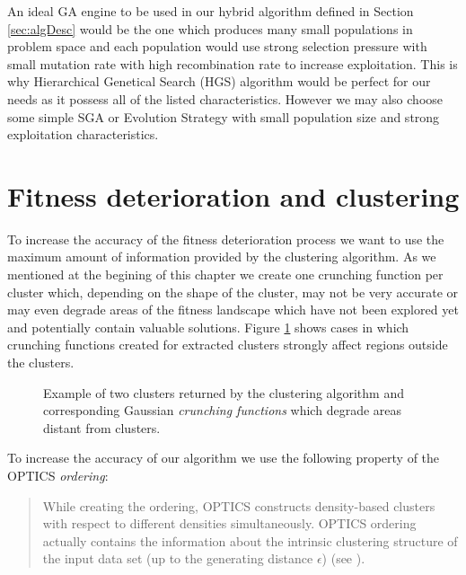 An ideal GA engine to be used in our hybrid algorithm defined in Section
\ref{sec:algDesc} would be the one which produces many small populations in problem space and
each population would use strong selection pressure with small mutation rate
with high recombination rate to increase exploitation. This is why Hierarchical 
Genetical Search (HGS) \cite{WierzbaSemczukKolodziejSchaefer2003} algorithm
would be perfect for our needs as it possess all of the listed characteristics. 
However we may also choose some simple 
SGA or Evolution Strategy with small population size and strong exploitation
characteristics.
 

\section{Fitness deterioration and clustering}
\label{sec:FitDetClust}

To increase the accuracy of the fitness deterioration process 
we want to use the maximum amount of information provided by the clustering
algorithm. As we mentioned at the begining of this chapter we create one
crunching function per cluster which, depending on the shape of the cluster, 
may not be very accurate or may even degrade areas
of the fitness landscape which have not been explored yet and potentially
contain valuable solutions. 
Figure \ref{fig:hardClusters1} shows cases in which
crunching functions created for extracted clusters strongly affect regions outside the clusters.

\begin{figure}
  \centering
  \caption{Example of two clusters returned by the clustering algorithm
  and corresponding Gaussian \textit{crunching functions} which degrade
  areas distant from clusters.}
  \label{fig:hardClusters1}
\end{figure}
 
 
To increase the accuracy of our algorithm
we use the following property of the OPTICS \textit{ordering}:
\begin{quotation}
\noindent
While creating the ordering, OPTICS constructs density-based clusters
with respect to different densities simultaneously. OPTICS ordering
actually contains the information about the intrinsic clustering structure of
the input data set (up to the generating distance $\epsilon$) 
(see \cite{optics}).
\end{quotation}

